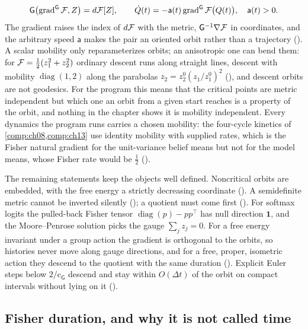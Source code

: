 \[
\mathsf G\bigl(\operatorname{grad}^{\mathsf G}\mathcal F,Z\bigr)=d\mathcal F[Z],
\qquad
\dot Q(t)=-\mathsf a(t)\operatorname{grad}^{\mathsf G}\mathcal F\bigl(Q(t)\bigr),
\quad\mathsf a(t)>0 .
\]
The gradient raises the index of $d\mathcal F$ with the metric, $\mathsf G^{-1}\nabla\mathcal F$ in
coordinates, and the arbitrary speed $\mathsf a$ makes the pair an oriented orbit rather than a
trajectory (). A scalar mobility only reparameterizes orbits; an
anisotropic one can bend them: for $\mathcal F=\tfrac12(z_1^2+z_2^2)$ ordinary descent runs along
straight lines, descent with mobility $\operatorname{diag}(1,2)$ along the parabolas
$z_2=z_2^0(z_1/z_1^0)^2$ (), and descent orbits are not
geodesics. For the program this means that the critical points are metric independent but which one
an orbit from a given start reaches is a property of the orbit, and nothing in the chapter shows it is
mobility independent. Every dynamics the program runs carries a chosen mobility: the four-cycle
kinetics of \cref{comp:ch08,comp:ch13} use identity mobility with supplied rates, which is the Fisher
natural gradient for the unit-variance belief means but not for the model means, whose Fisher rate
would be $\tfrac12$ ().

The remaining statements keep the objects well defined. Noncritical orbits are embedded, with the
free energy a strictly decreasing coordinate (). A semidefinite
metric cannot be inverted silently (); a quotient must
come first (). For softmax logits the pulled-back Fisher tensor
$\operatorname{diag}(p)-pp^\top$ has null direction $\mathbf 1$, and the Moore--Penrose solution picks
the gauge $\sum_jz_j=0$. For a free energy invariant under a group action the gradient is orthogonal
to the orbits, so histories never move along gauge directions, and for a free, proper, isometric
action they descend to the quotient with the same duration
(). Explicit Euler steps below
$2/\mathrm c_{\mathsf G}$ descend and stay within $O(\Delta t)$ of the orbit on compact intervals
without lying on it ().

\subsection{Fisher duration, and why it is not called time}
\label{comp:ch07-formulas-clock}


